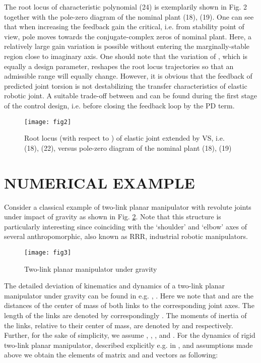\documentclass[a4paper, 10pt, conference]{ieeeconf}
\begin{document}
The root locus of characteristic polynomial (24) is exemplarily
shown in Fig. 2 together with the pole-zero diagram of the nominal
plant (18), (19). One can see that when increasing the feedback
gain  the critical, i.e. from stability point of view, pole
moves towards the conjugate-complex zeros of nominal plant. Here,
a relatively large gain variation is possible without entering the
marginally-stable region close to imaginary axis. One should note
that the variation of , which is equally a design parameter,
reshapes the root locus trajectories so that an admissible 
range will equally change. However, it is obvious that the
feedback of predicted joint torsion is not destabilizing the
transfer characteristics of elastic robotic joint. A suitable
trade-off between  and  can be found during the first
stage of the control design, i.e. before closing the feedback loop
by the PD term.
\begin{figure}[!h]
\centering
\texttt{[image: fig2]}
\caption{Root locus (with respect to ) of elastic joint
extended by VS, i.e. (18), (22), versus pole-zero diagram of the
nominal plant (18), (19)} \label{fig:pzmap}
\end{figure}




\section{NUMERICAL EXAMPLE}
\label{sec:5}

Consider a classical example of two-link planar manipulator with
revolute joints under impact of gravity as shown in Fig.
\ref{fig:planararm}. Note that this structure is particularly
interesting since coinciding with the `shoulder' and `elbow' axes
of several anthropomorphic, also known as RRR, industrial robotic
manipulators.
\begin{figure}[!h]
\centering
\texttt{[image: fig3]}
\caption{Two-link planar manipulator under gravity}
\label{fig:planararm}
\end{figure}
The detailed deviation of kinematics and dynamics of a two-link
planar manipulator under gravity can be found in e.g.
\cite{spong2006}, \cite{Sicil2009}. Here we note that  and
 are the distances of the center of mass of both links to
the corresponding joint axes. The length of the links are denoted
by  correspondingly . The moments of inertia of the
links, relative to their center of mass, are denoted by 
and  respectively. Further, for the sake of simplicity, we
assume , , , and . For the dynamics of rigid two-link
planar manipulator, described explicitly e.g. in
\cite{spong2006,Sicil2009}, and assumptions made above we obtain
the elements of  matrix and  and  vectors as following:
\end{document}
